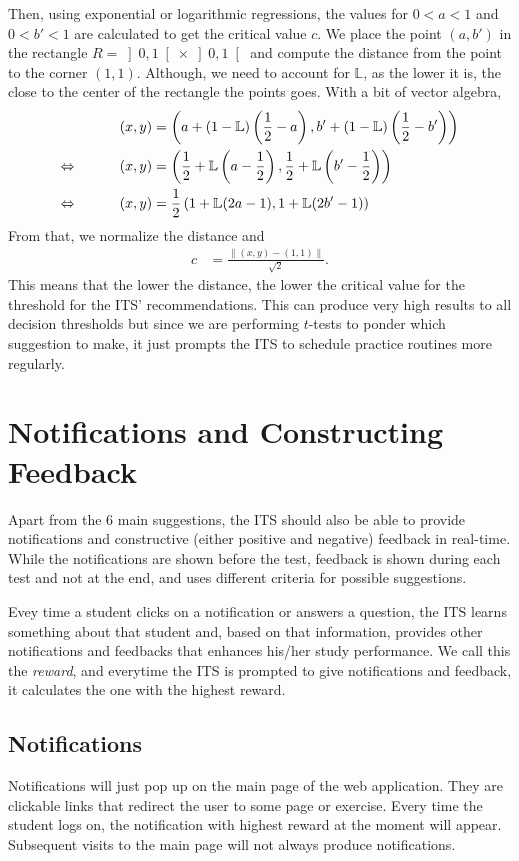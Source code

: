 \documentclass{article}
\newcommand{\0}{\mathbbold{0}}
\newcommand{\1}{\mathds{1}}
\newcommand{\2}{\mathbbold{2}}
\newcommand{\LRA}{\Leftrightarrow\mkern40mu}
\newcommand{\openinter}[2]{\left]#1,#2\right[}
\begin{document}
Then, using exponential or logarithmic regressions, the values for $0<a<1$ and $0<b'<1$ are calculated to get the critical value $c$.
We place the point $(a,b')$ in the rectangle $R = \openinter{0}{1}\times\openinter{0}{1}$ and compute the distance from the point to the corner $(1,1)$.
Although, we need to account for $\mathbb{L}$, as the lower it is, the close to the center of the rectangle the points goes. With a bit of vector algebra,
\begin{alignat*}{2}
    && (x,y) &= \left(a + (1-\mathbb{L})\left(\frac{1}{2} - a\right),b' + (1-\mathbb{L})\left(\frac{1}{2} - b'\right)\right) \\
    \LRA && (x,y) &= \left(\frac{1}{2}+\mathbb{L}\left(a-\frac{1}{2}\right),\frac{1}{2}+\mathbb{L}\left(b'-\frac{1}{2}\right)\right) \\
    \LRA && (x,y) &= \frac{1}{2}\left(1+\mathbb{L}(2a-1),1+\mathbb{L}(2b'-1)\right)
\end{alignat*}
From that, we normalize the distance and
\begin{align*}
    c &= \frac{\left\|(x,y) - (1,1)\right\|}{\sqrt{2}}.
\end{align*}
This means that the lower the distance, the lower the critical value for the threshold for the ITS' recommendations. This can produce very high results to all decision thresholds but since we are performing $t$-tests to ponder which suggestion to make, it just prompts the ITS to schedule practice routines more regularly.

\section{Notifications and Constructing Feedback}
Apart from the 6 main suggestions, the ITS should also be able to provide notifications and constructive (either positive and negative) feedback in real-time. While the notifications are shown before the test, feedback is shown during each test and not at the end, and uses different criteria for possible suggestions.

Evey time a student clicks on a notification or answers a question, the ITS learns something about that student and, based on that information, provides other notifications and feedbacks that enhances his/her study performance.
We call this the \textsl{reward}, and everytime the ITS is prompted to give notifications and feedback, it calculates the one with the highest reward.

\subsection{Notifications}
Notifications will just pop up on the main page of the web application. They are clickable links that redirect the user to some page or exercise.
Every time the student logs on, the notification with highest reward at the moment will appear. Subsequent visits to the main page will not always produce notifications.
\end{document}
